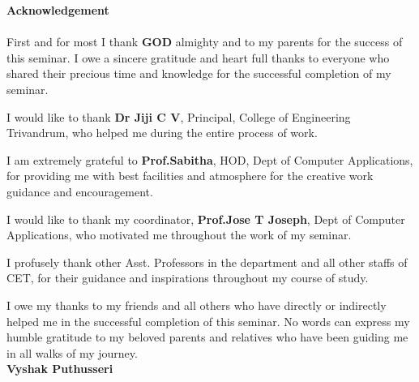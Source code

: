 \begin{titlepage}
\begin{center}
\textbf{\LARGE{Acknowledgement}}\\[0.5cm] 
\end{center}
\paragraph{}
First and for most I thank \textbf{GOD} almighty and to my parents for the success of this seminar. I owe a sincere gratitude and heart full thanks to everyone who shared their precious time and knowledge for the successful completion of my seminar.

I would like to thank \textbf{Dr Jiji C V}, Principal,  College of Engineering Trivandrum, who helped me during the entire process of work.

I am extremely grateful to \textbf{Prof.Sabitha}, HOD, Dept of Computer Applications, for providing me with best facilities and atmosphere for the creative work guidance and encouragement.

I would like to thank my coordinator,\textbf{ Prof.Jose T Joseph}, Dept of Computer Applications, who motivated me throughout the work of my seminar.  

I profusely thank other Asst. Professors in the department and all other staffs of CET, for their guidance and inspirations throughout my course of study.

I owe my thanks to my friends and all others who have directly or indirectly helped me in the successful completion of this seminar. No words can express my humble gratitude to my beloved parents and relatives who have been guiding me in all walks of my journey.\\

 \vspace{1.1cm}
\hspace{345pt} \textbf{Vyshak Puthusseri}


\end{titlepage}
